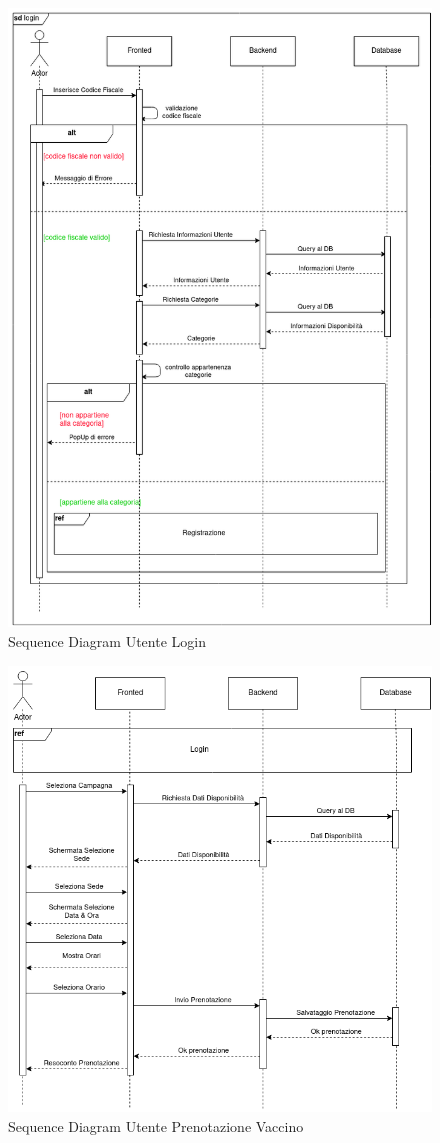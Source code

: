 \documentclass[a4paper,12pt,openany,oneside]{book}
\begin{document}
\begin{figure}[h] 
\centering
\includegraphics[width=0.8\columnwidth]{Authentication-Page-1.png} 
\caption{Sequence Diagram Utente Login}
\end{figure}
\newpage
\begin{figure}[h] 
\centering
\includegraphics[width=0.8\columnwidth]{Stystem.png} 
\caption{Sequence Diagram Utente Prenotazione Vaccino} 
\end{figure}
\newpage
\end{document}
